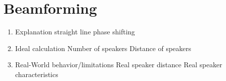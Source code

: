 \section{Beamforming}

\begin{enumerate}
  \item Explanation
  \subitem straight line
  \subitem phase shifting
  \item Ideal calculation
  \subitem Number of speakers
  \subitem Distance of speakers
  \item Real-World behavior/limitations
  \subitem Real speaker distance
  \subitem Real speaker characteristics
\end{enumerate}